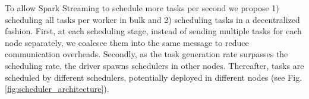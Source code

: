To allow Spark Streaming to schedule more tasks per second we propose 1) scheduling all tasks per worker in bulk and 2) scheduling tasks in a decentralized fashion.
First, at each scheduling stage, instead of sending multiple tasks for each node separately, we coalesce them into the same message to reduce communication overheads.
Secondly, as the task generation rate surpasses the scheduling rate, the driver spawns schedulers in other nodes. Thereafter, tasks are scheduled by different schedulers, potentially deployed in different nodes (see Fig. \ref{fig:scheduler_architecture}).

